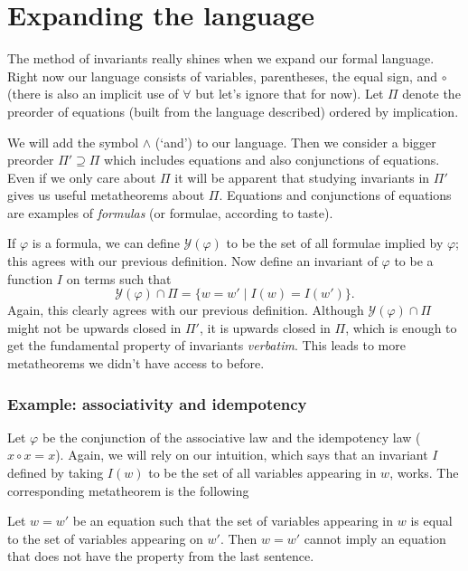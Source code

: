 \section{Expanding the language}
The method of invariants really shines when we expand our formal language. Right now our language consists of variables, parentheses, the equal sign, and $\circ$ (there is also an implicit use of $\forall$ but let's ignore that for now).  Let $\Pi$ denote the preorder of equations (built from the language described) ordered by implication.

We will add the symbol $\wedge$ (`and') to our language. Then we consider a bigger preorder $\Pi' \supseteq \Pi$ which includes equations and also conjunctions of equations. Even if we only care about $\Pi$ it will be apparent that studying invariants in $\Pi'$ gives us useful metatheorems about $\Pi$. Equations and conjunctions of equations are examples of \emph{formulas} (or formulae, according to taste).

If $\varphi$ is a formula, we can define $\mathcal{Y}(\varphi)$ to be the set of all formulae implied by $\varphi$; this agrees with our previous definition. Now define an invariant of $\varphi$ to be a function $I$ on terms such that
\[
\mathcal{Y}(\varphi) \cap \Pi = \{w = w' \mid I(w) = I(w')\}.
\]
Again, this clearly agrees with our previous definition. Although $\mathcal{Y}(\varphi) \cap \Pi$ might not be upwards closed in $\Pi'$, it is upwards closed in $\Pi$, which is enough to get the fundamental property of invariants \emph{verbatim}. This leads to more metatheorems we didn't have access to before.

\subsubsection*{Example: associativity and idempotency}
Let $\varphi$ be the conjunction of the associative law and the idempotency law ($x \circ x = x$). Again, we will rely on our intuition, which says that an invariant $I$ defined by taking $I(w)$ to be the set of all variables appearing in $w$, works. The corresponding metatheorem is the following

\begin{metatheorem}
	Let $w = w'$ be an equation such that the set of variables appearing in $w$ is equal to the set of variables appearing on $w'$. Then $w = w'$ cannot imply an equation that does not have the property from the last sentence.
\end{metatheorem}

